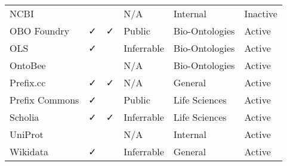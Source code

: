 \begin{table}
\begin{tabular}{llllll}
           NCBI &                                &                        &         N/A &        Internal &     Inactive \\
    OBO Foundry &                              ✓ &                      ✓ &      Public &  Bio-Ontologies &       Active \\
            OLS &                              ✓ &                        &  Inferrable &  Bio-Ontologies &       Active \\
        OntoBee &                                &                        &         N/A &  Bio-Ontologies &       Active \\
      Prefix.cc &                              ✓ &                      ✓ &         N/A &         General &       Active \\
 Prefix Commons &                              ✓ &                        &      Public &   Life Sciences &       Active \\
        Scholia &                              ✓ &                      ✓ &  Inferrable &   Life Sciences &       Active \\
        UniProt &                                &                        &         N/A &        Internal &       Active \\
       Wikidata &                              ✓ &                        &  Inferrable &         General &       Active \\
\bottomrule
\end{tabular}
\end{table}
